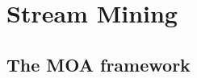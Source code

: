 \section{Stream Mining}
\label{State::StreamMining}

\subsection{The MOA framework}
\label{State::StreamMining::MOA}
